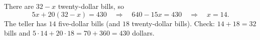 There are $32-x$ twenty-dollar bills, so
\[
5x+20(32-x)=430\quad\Longrightarrow\quad 640-15x=430\quad\Longrightarrow\quad x=14 .
\]
The teller has $\boxed{14}$ five-dollar bills (and $18$ twenty-dollar bills). Check: $14+18=32$ bills and $5\cdot14+20\cdot18=70+360=430$ dollars.
